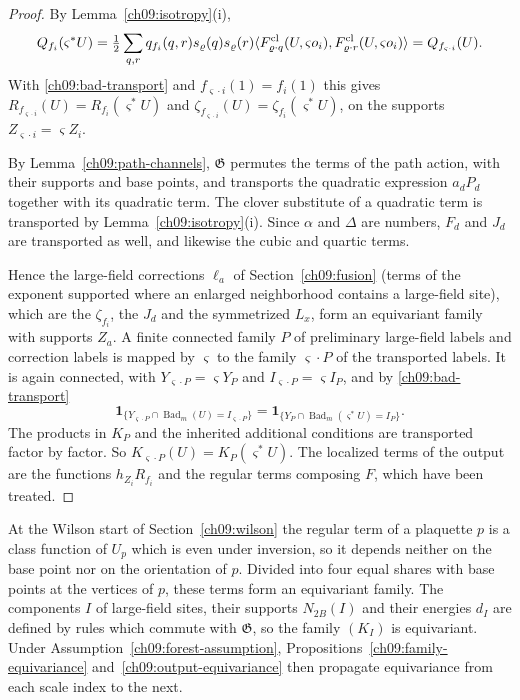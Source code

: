 \begin{proof}
By Lemma~\ref{ch09:isotropy}(i),
\[
 Q_{f_i}(\varsigma^*U)
   =\tfrac12\sum_{q,r}q_{f_i}(q,r)s_\varrho(q)s_\varrho(r)
   \langle F^{\rm cl}_{\varrho\cdot q}(U,\varsigma o_i),
           F^{\rm cl}_{\varrho\cdot r}(U,\varsigma o_i)\rangle
   =Q_{f_{\varsigma\cdot i}}(U).
\]
With \eqref{ch09:bad-transport} and
$f_{\varsigma\cdot i}(1)=f_i(1)$ this gives
$R_{f_{\varsigma\cdot i}}(U)=R_{f_i}(\varsigma^*U)$ and
$\zeta_{f_{\varsigma\cdot i}}(U)=\zeta_{f_i}(\varsigma^*U)$, on the
supports $Z_{\varsigma\cdot i}=\varsigma Z_i$.

By Lemma~\ref{ch09:path-channels}, $\mathfrak G$ permutes the terms
of the path action, with their supports and base points, and transports
the quadratic expression $a_dP_d$ together with its quadratic term. The clover
substitute of a quadratic term is transported by
Lemma~\ref{ch09:isotropy}(i). Since $\alpha$ and $\Delta$ are numbers,
$F_d$ and $J_d$ are transported as well, and likewise the cubic and
quartic terms.

Hence the large-field corrections $\ell_a$ of
Section~\ref{ch09:fusion} (terms of the exponent supported where an enlarged neighborhood contains a large-field site), which are the $\zeta_{f_i}$, the $J_d$ and
the symmetrized $L_x$, form an equivariant family with supports $Z_a$.
A finite connected family $P$ of preliminary large-field labels and
correction labels is mapped by $\varsigma$ to the family
$\varsigma\cdot P$ of the transported labels. It is again connected,
with $Y_{\varsigma\cdot P}=\varsigma Y_P$ and
$I_{\varsigma\cdot P}=\varsigma I_P$, and by
\eqref{ch09:bad-transport}
\[
 \mathbf1_{\{Y_{\varsigma\cdot P}\cap\operatorname{Bad}_m(U)
              =I_{\varsigma\cdot P}\}}
 =\mathbf1_{\{Y_P\cap\operatorname{Bad}_m(\varsigma^*U)=I_P\}} .
\]
The products in $K_P$ and the inherited additional conditions are
transported factor by factor. So
$K_{\varsigma\cdot P}(U)=K_P(\varsigma^*U)$. The
localized terms of the output are the functions
$h_{Z_i}R_{f_i}$ and the regular terms composing $F$, which
have been treated.
\end{proof}

At the Wilson start of Section~\ref{ch09:wilson} the regular term of a
plaquette $p$ is a class function of $U_p$ which is even under
inversion, so it depends neither on the base point nor on the
orientation of $p$. Divided into four equal shares with base points at the
vertices of $p$, these terms form an equivariant family. The components
$I$ of large-field sites, their supports $N_{2B}(I)$ and their
energies $d_I$ are defined by rules which commute with $\mathfrak G$,
so the family $(K_I)$ is equivariant. Under
Assumption~\ref{ch09:forest-assumption},
Propositions~\ref{ch09:family-equivariance}
and~\ref{ch09:output-equivariance} then propagate equivariance from
each scale index to the next.

